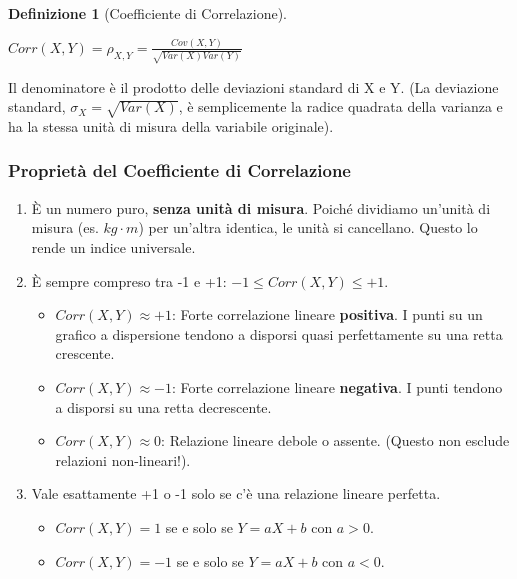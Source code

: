 \documentclass[a4paper, 11pt]{article}
\theoremstyle{definition}
\newtheorem{definizione}{Definizione}[section]
\begin{document}
\begin{definizione}[Coefficiente di Correlazione]
\begin{formulabox}
    $Corr(X,Y) = \rho_{X,Y} = \frac{Cov(X,Y)}{\sqrt{Var(X)Var(Y)}}$
\end{formulabox}
Il denominatore è il prodotto delle deviazioni standard di X e Y. (La deviazione standard, $\sigma_X = \sqrt{Var(X)}$, è semplicemente la radice quadrata della varianza e ha la stessa unità di misura della variabile originale).
\end{definizione}

\subsubsection*{Proprietà del Coefficiente di Correlazione}
\begin{enumerate}
    \item È un numero puro, \textbf{senza unità di misura}. Poiché dividiamo un'unità di misura (es. $kg \cdot m$) per un'altra identica, le unità si cancellano. Questo lo rende un indice universale.
    \item È sempre compreso tra -1 e +1: $-1 \le Corr(X,Y) \le +1$.
    \begin{itemize}
        \item \textbf{$Corr(X,Y) \approx +1$}: Forte correlazione lineare \textbf{positiva}. I punti su un grafico a dispersione tendono a disporsi quasi perfettamente su una retta crescente.
        \item \textbf{$Corr(X,Y) \approx -1$}: Forte correlazione lineare \textbf{negativa}. I punti tendono a disporsi su una retta decrescente.
        \item \textbf{$Corr(X,Y) \approx 0$}: Relazione lineare debole o assente. (Questo non esclude relazioni non-lineari!).
    \end{itemize}
    \item Vale esattamente +1 o -1 solo se c'è una relazione lineare perfetta.
    \begin{itemize}
        \item $Corr(X,Y) = 1$ se e solo se $Y = aX+b$ con $a > 0$.
        \item $Corr(X,Y) = -1$ se e solo se $Y = aX+b$ con $a < 0$.
    \end{itemize}
\end{enumerate}

\newpage
\end{document}
